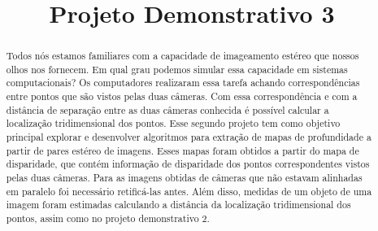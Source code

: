 \documentclass{bmvc2k}
\title{Projeto Demonstrativo 3}
\begin{document}
\maketitle

\begin{abstract}
Todos nós estamos familiares com a capacidade de imageamento estéreo que nossos olhos nos fornecem. Em qual grau podemos simular essa capacidade em sistemas computacionais? Os computadores realizaram essa tarefa achando correspondências entre pontos que são vistos pelas duas câmeras. Com essa correspondência e com a distância de separação entre as duas câmeras conhecida é possível calcular a localização tridimensional dos pontos.
Esse segundo projeto tem como objetivo principal explorar e desenvolver algoritmos para extração de mapas de profundidade a partir de pares estéreo de imagens. Esses mapas foram obtidos a partir do mapa de disparidade, que contém informação de disparidade dos pontos correspondentes vistos pelas duas câmeras. Para as imagens obtidas de câmeras que não estavam alinhadas em paralelo foi necessário retificá-las antes. Além disso, medidas de um objeto de uma imagem foram estimadas calculando a distância da localização tridimensional dos pontos, assim como no projeto demonstrativo 2.
\end{abstract}

\end{document}

